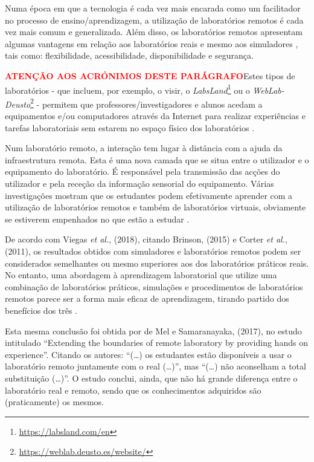 Numa época em que a tecnologia é cada vez mais encarada como um facilitador no processo de ensino/aprendizagem, a utilização de laboratórios remotos é cada vez mais comum e generalizada. Além disso, os laboratórios remotos apresentam algumas vantagens em relação aos laboratórios reais e mesmo aos simuladores \cite{RemoteLabsImpactVISIR}, tais como: flexibilidade, acessibilidade, disponibilidade e segurança.

\textcolor{red}{\textbf{ATENÇÃO AOS ACRÓNIMOS DESTE PARÁGRAFO}}Estes tipos de laboratórios - que incluem, por exemplo, o \acrshort{visir}, o \textit{LabsLand}\footnote{\url{https://labsland.com/en}} ou o \textit{WebLab-Deusto}\footnote{\url{https://weblab.deusto.es/website/}} - permitem que professores/investigadores e alunos acedam a equipamentos e/ou computadores através da Internet para realizar experiências e tarefas laboratoriais sem estarem no espaço físico dos laboratórios \cite{ExperiencesRemoteLab}.

Num \acrshort{laboratório remoto}, a interação tem lugar à distância com a ajuda da infraestrutura remota. Esta é uma nova camada que se situa entre o utilizador e o equipamento do laboratório. É responsável pela transmissão das acções do utilizador e pela receção da informação sensorial do equipamento.
Várias investigações mostram que os estudantes podem efetivamente aprender com a utilização de laboratórios remotos e também de laboratórios virtuais, obviamente se estiverem empenhados no que estão a estudar \cite{RemoteLabsImpactVISIR}.

De acordo com Viegas \textit{et al.}, (2018)\cite{ImpactRemoteLabTeachingPractices}, citando Brinson, (2015)\cite{BRINSON2015218} e Corter \textit{et al.}, (2011)\cite{CORTER20112054}, os resultados obtidos com simuladores e laboratórios remotos podem ser considerados semelhantes ou mesmo superiores aos dos laboratórios práticos reais. No entanto, uma abordagem à aprendizagem laboratorial que utilize uma combinação de laboratórios práticos, simulações e procedimentos de laboratórios remotos parece ser a forma mais eficaz de aprendizagem, tirando partido dos benefícios dos três \cite{BRINSON2015218}.

Esta mesma conclusão foi obtida por de Mel e Samaranayaka, (2017), no estudo intitulado ``Extending the boundaries of remote laboratory by providing hands on experience''. Citando os autores: ``(\ldots) os estudantes estão disponíveis a usar o \acrshort{laboratório remoto} juntamente com o real (\ldots)'', mas ``(\ldots) não aconselham a total substituição (\ldots)''. O estudo conclui, ainda, que não há grande diferença entre o laboratório real e remoto, sendo que os conhecimentos adquiridos são (praticamente) os mesmos\cite{deMel}.

